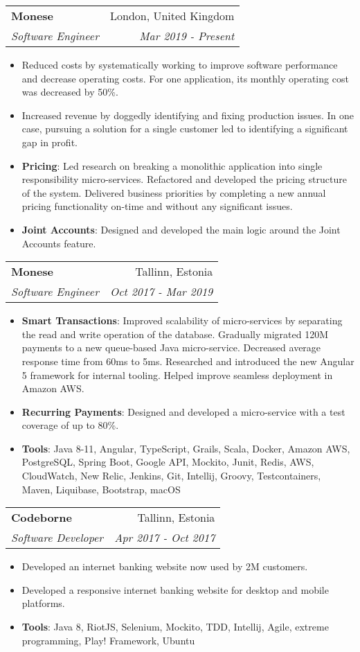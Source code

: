 \documentclass[11pt,a4paper,oneside]{report}
\makeatletter
\newcommand{\resumeItem}[2]{
    \item\small{
        \textbf{#1}{: #2 \vspace{-2pt}}
    }
}
\newcommand{\resumeItemWithoutTitle}[2]{
    \item\small{
        \textbf{#1}{#2\vspace{-2pt}}
    }
}
\newcommand{\resumeSubheading}[4]{
    \vspace{-1pt}\item
    \begin{tabular*}{0.97\textwidth}[t]{l@{\extracolsep{\fill}}r}
        \textbf{#1} & #2 \\
        \textit{\small#3} & \textit{\small #4} \\
    \end{tabular*}\vspace{-5pt}
}
\newcommand{\resumeSubSubheading}[2]{
    \begin{tabular*}{0.97\textwidth}{l@{\extracolsep{\fill}}r}
        \textit{\small#1} & \textit{\small #2} \\
    \end{tabular*}\vspace{-5pt}
}
\newcommand{\resumeItemListStart}{\begin{itemize}}
\newcommand{\resumeItemListEnd}{\end{itemize}\vspace{-5pt}}
\makeatother
\begin{document}
\resumeSubheading
{Monese}{London, United Kingdom}
{Software Engineer}{Mar 2019 - Present}
  \resumeItemListStart
    \resumeItemWithoutTitle{}
    {Reduced costs by systematically working to improve software performance and decrease operating costs. For one application, its monthly operating cost was decreased by 50\%.}
    \resumeItemWithoutTitle{}
    {Increased revenue by doggedly identifying and fixing production issues. In one case, pursuing a solution for a single customer led to identifying a significant gap in profit.}
    \resumeItem{Pricing}
    {Led research on breaking a monolithic application into single responsibility micro-services. Refactored and developed the pricing structure of the system. Delivered business priorities by completing a new annual pricing functionality on-time and without any significant issues.}
    \resumeItem{Joint Accounts}
    {Designed and developed the main logic around the Joint Accounts feature.}
  \resumeItemListEnd

\resumeSubheading
{Monese}{Tallinn, Estonia}
{Software Engineer}{Oct 2017 - Mar 2019}
  \resumeItemListStart
    \resumeItem{Smart Transactions}
    {Improved scalability of micro-services by separating the read and write operation of the database. Gradually migrated 120M payments to a new queue-based Java micro-service. Decreased average response time from 60ms to 5ms. Researched and introduced the new Angular 5 framework for internal tooling. Helped improve seamless deployment in Amazon AWS.}
    \resumeItem{Recurring Payments}
    {Designed and developed a micro-service with a test coverage of up to 80\%.}
    \resumeItem{Tools}
    {Java 8-11, Angular, TypeScript, Grails, Scala, Docker, Amazon AWS, PostgreSQL, Spring Boot,
    Google API, Mockito, Junit, Redis, AWS, CloudWatch, New Relic, Jenkins, Git, Intellij, Groovy,
    Testcontainers, Maven, Liquibase, Bootstrap, macOS}
  \resumeItemListEnd

\resumeSubheading
{Codeborne}{Tallinn, Estonia}
{Software Developer}{Apr 2017 - Oct 2017}
  \resumeItemListStart
    \resumeItemWithoutTitle{}
    {Developed an internet banking website now used by 2M customers.}
    \resumeItemWithoutTitle{}
    {Developed a responsive internet banking website for desktop and mobile platforms.}
    \resumeItem{Tools}
    {Java 8, RiotJS, Selenium, Mockito, TDD, Intellij, Agile, extreme programming, Play! Framework,
    Ubuntu}
  \resumeItemListEnd
\end{document}
